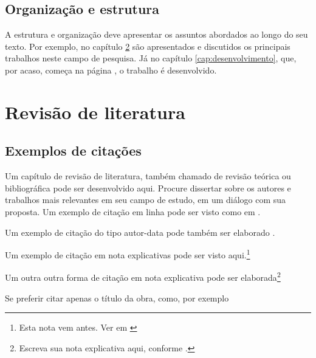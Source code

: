 \documentclass[
	12pt,				%
	openright,			%
	oneside,			%
	a4paper,			%
	english,			%
	brazil				%
	]{abntex2}
\begin{document}
%
%

\section{Organização e estrutura}

A estrutura e organização deve apresentar os assuntos abordados ao longo do seu texto. Por exemplo, no capítulo \ref{cap:revisao-de-literatura} são apresentados e discutidos os principais trabalhos neste campo de pesquisa. Já no capítulo \ref{cap:desenvolvimento}, que, por acaso, começa na página \pageref{cap:desenvolvimento}, o trabalho é desenvolvido.



\chapter{Revisão de literatura} \label{cap:revisao-de-literatura}

\section{Exemplos de citações}

Um capítulo de revisão de literatura, também chamado de revisão teórica ou bibliográfica pode ser desenvolvido aqui. Procure dissertar sobre os autores e trabalhos mais relevantes em seu campo de estudo, em um diálogo com sua proposta. Um exemplo de citação em linha pode ser visto como em \textcite{Einstein1920}. 

Um exemplo de citação do tipo autor-data pode também ser elaborado \cite{Einstein1920}. 

Um exemplo de citação em nota explicativas pode ser visto aqui.\footnote{Esta nota vem antes. Ver em \textcite[p.~22]{descartes-carta-mersene}} 

Um outra outra forma de citação em nota explicativa pode ser elaborada\footnote{Escreva sua nota explicativa aqui, conforme \cite{boyle1772}.}

Se preferir citar apenas o título da obra, como, por exemplo 
\end{document}
